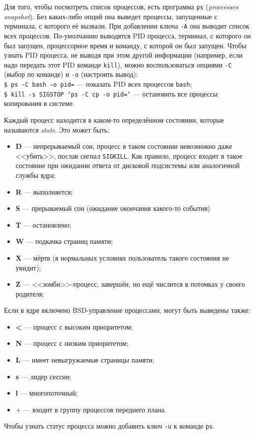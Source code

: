 Для того, чтобы посмотреть список процессов, есть программа \texttt{ps} (\emph{proccesses snapshot}). Без каких-либо опций она выведет процессы, запущенные с терминала, с которого её вызвали. При добавлении ключа \texttt{-A} она выводит список всех процессов. По-умолчанию выводятся PID процесса, терминал, с которого он был запущен, процессорное время и команду, с которой он был запущен.
Чтобы узнать PID процесса, не выводя при этом другой информации (например, если надо передать этот PID команде \texttt{kill}), можно воспользоваться опциями \texttt{-C} (выбор по команде) и \texttt{-o} (настроить вывод):\\
\texttt{\$ ps -C bash -o pid=} --- показать PID всех процессов \texttt{bash};\\
\texttt{\$ kill -s SIGSTOP `ps -C cp -o pid=`} --- остановить все процессы копирования в системе.

Каждый процесс находится в каком-то определённом состоянии, которые называются \emph{state}. Это может быть:
\begin{itemize}
 \item \textbf{D} --- непрерываемый сон, процесс в таком состоянии невозможно даже <<убить>>, послав сигнал \texttt{SIGKILL}. Как правило, процесс входит в такое состояние при ожидании ответа от дисковой подсистемы или аналогичной службы ядра;
 \item \textbf{R} --- выполняется;
 \item \textbf{S} --- прерываемый сон (ожидание окончания какого-то события)
 \item \textbf{T} --- остановлено;
 \item \textbf{W} --- подкачка страниц памяти;
 \item \textbf{X} --- мёртв (в нормальных условиях пользователь такого состояния не увидит);
 \item \textbf{Z} --- <<зомби>>-процесс, завершён, но ещё числится в потомках у своего родителя;
\end{itemize}
Если в ядре включено BSD-управление процессами, могут быть выведены также:
\begin{itemize}
 \item \textbf{<} --- процесс с высоким приоритетом;
 \item \textbf{N} --- процесс с низким приоритетом;
 \item \textbf{L} --- имеет невыгружаемые страницы памяти;
 \item \textbf{s} --- лидер сессии;
 \item \textbf{l} --- многопоточный;
 \item \textbf{$+$} --- входит в группу процессов переднего плана.
\end{itemize}
Чтобы узнать статус процесса можно добавить ключ \texttt{-u} к команде \texttt{ps}.

